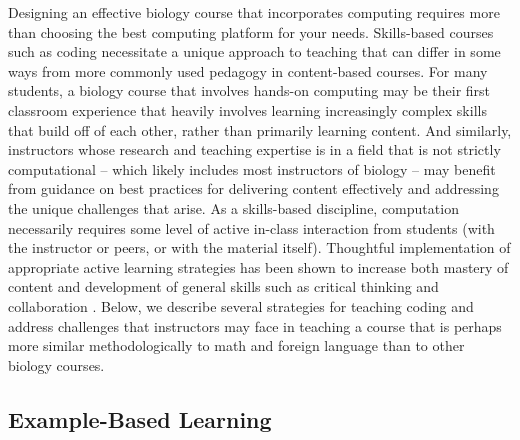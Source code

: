 Designing an effective biology course that incorporates computing requires more than choosing the best computing platform for your needs. Skills-based courses such as coding necessitate a unique approach to teaching that can differ in some ways from more commonly used pedagogy in content-based courses. 
For many students, a biology course that involves hands-on computing may be their first classroom experience that heavily involves learning increasingly complex skills that build off of each other, rather than primarily learning content. And similarly, instructors whose research and teaching expertise is in a field that is not strictly computational -- which likely includes most instructors of biology -- may benefit from guidance on best practices for delivering content effectively and addressing the unique challenges that arise. As a skills-based discipline, computation 
necessarily requires some level of active in-class interaction from students (with the instructor or peers, or with the material itself). Thoughtful implementation of appropriate active learning strategies has been shown to increase both mastery of content and development of general skills such as critical thinking and collaboration \citep{faust_paulson_1998}. Below, we describe several strategies for teaching coding and address challenges that instructors may face in teaching a course that is perhaps more similar methodologically to math and foreign language than to other biology courses.

\subsection{Example-Based Learning}

